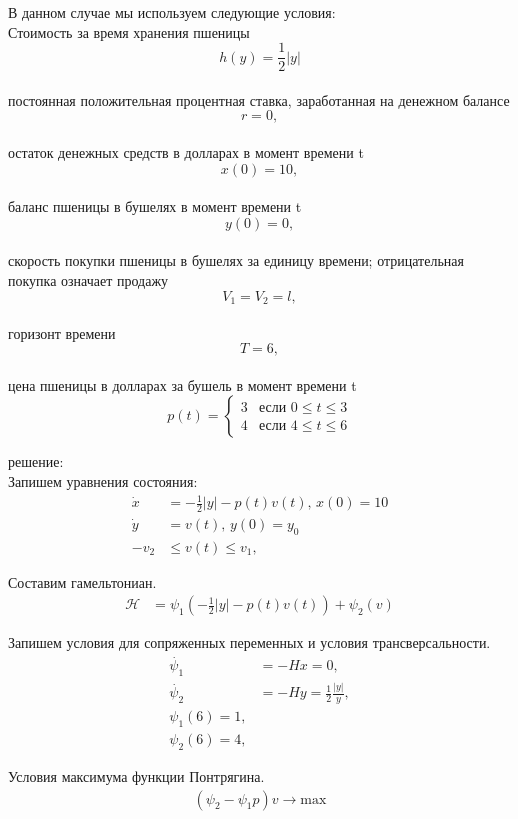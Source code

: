 В данном случае мы используем следующие условия:\\
 Стоимость за время хранения пшеницы $$ h(y) = \frac{1}{2}|y|$$\\
постоянная положительная процентная ставка, заработанная на денежном балансе $$ r = 0, $$\\
остаток денежных средств в долларах в момент времени t $$ x(0) = 10, $$\\
баланс пшеницы в бушелях в момент времени t $$ y(0) = 0, $$\\
скорость покупки пшеницы в бушелях за единицу времени; отрицательная покупка означает продажу $$ V_{1} = V_{2} = l, $$\\
горизонт времени $$ T = 6, $$\\
цена пшеницы в долларах за бушель в момент времени t
\begin{displaymath}
p(t) =\left\{ \begin{array}{ll}
 3 & \textrm{если $0 \le t\le 3$}\\
 4 & \textrm{если $4  \le t  \le 6$}
  \end{array} \right.
\end{displaymath}


решение:\\

Запишем уравнения состояния:
\begin{align}
    \Dot{x} & = - \frac{1}{2}|y| - p(t) v(t),\, x(0) = 10 \\
    \Dot{y} & = v(t), \, y(0) = y_{0}\\
    - v_2 & \le v(t) \le v_1,
\end{align}     

Составим гамельтониан. 
\begin{align}
    \mathcal{H} & = \psi_{1} (- \frac{1}{2}|y| - p(t) v(t)) + \psi_{2} (v)
\end{align} 

Запишем условия для сопряженных переменных и условия трансверсальности.
\begin{align}
    \Dot{\psi_{1}} & = -H x = 0,\\
    \Dot{\psi_{2}} & = -H y =  \frac{1}{2}\frac{|y|}{y},\\
    {\psi_{1}(6)} = 1,\\
    {\psi_{2}(6)} = 4,
\end{align} 

Условия максимума функции Понтрягина.
\begin{align}
    (\psi_{2} - \psi_{1} p)v\to \mathrm{max}
\end{align} 

